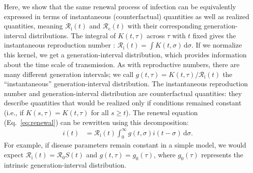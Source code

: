\documentclass[12pt]{article}
\newcommand{\eref}[1]{Eq.~\ref{eq:#1}}
\newcommand{\Rx}[1]{\ensuremath{{\mathcal R}_{#1}}\xspace}
\newcommand{\Ro}{\Rx{0}}
\newcommand{\Rc}{\Rx{\mathrm{c}}}
\newcommand{\Ri}{\Rx{\mathrm{i}}}
\newcommand{\dd}[1]{\ensuremath{\, \mathrm{d}#1}}
\newcommand{\dsigma}{\dd{\sigma}}
\begin{document}
Here, we show that the same renewal process of infection can be equivalently expressed in terms of instantaneous (counterfactual) quantities as well as realized quantities, meaning $\Ri(t)$ and $\Rc(t)$ with their corresponding generation-interval distributions.
The integral of $K(t, \tau)$ across $\tau$ with $t$ fixed gives the instantaneous reproduction number \citep{fraser2007estimating}: $\Ri(t) = \int K(t, \sigma) \dsigma$.
If we normalize this kernel, we get a generation-interval distribution, which provides information about the time scale of transmission.
As with reproductive numbers, there are many different generation intervals; we call $g(t, \tau) = K(t, \tau)/\Ri(t)$ the ``instantaneous'' generation-interval distribution.
The instantaneous reproduction number and generation-interval distribution are counterfactual quantities: they describe quantities that would be realized only if conditions remained constant (i.e., if $K(s, \tau) = K(t, \tau)$ for all $s \geq t$).
The renewal equation (\eref{renewal}) can be rewritten using this decomposition:
\begin{align}
i(t) &= \Ri(t) \int_0^\infty g(t, \sigma) i(t-\sigma) \dsigma.
\label{eq:renewal_instantaneous}
\end{align}
For example, if disease parameters remain constant in a simple model, we would expect $\Ri(t) = \Ro S(t)$ and $g(t, \tau) = g_0(\tau)$, where $g_0(\tau)$ represents the intrinsic generation-interval distribution.
\end{document}
